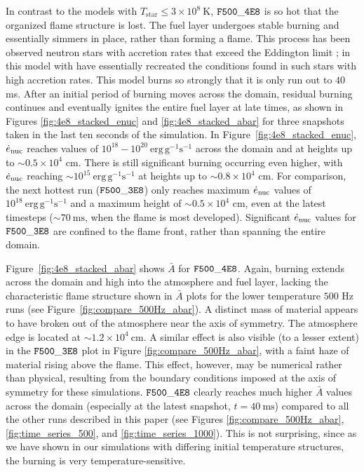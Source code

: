 \documentclass[preprint,times,tighten]{aastex63}
\newcommand{\enucdot}{\dot{e}_{\rm nuc}}
\newcommand{\MarginPar}[1]{
    \marginpar{\vskip-\baselineskip%
               \raggedright%
               \tiny\sffamily%
               {\color{red}\hrule%
               \smallskip%
               #1\par%
               \smallskip%
               \hrule}}%
}
\begin{document}
In contrast to the models with $T_{\mathrm{star}} \leq 3 \times 10^8~\mathrm{K}$, $\tt{F500\_4E8}$ is so hot that the organized flame structure is lost. The fuel layer undergoes stable burning and essentially simmers in place, rather than forming a flame. This process has been observed neutron stars with accretion rates that exceed the Eddington limit \citep{fujimoto1981,bildsten1998thermonuclear,keek2009effect}; in this model with have essentially recreated the conditions found in such stars with high accretion rates. This model burns so strongly that it is only run out to $40$ ms. After an initial period of burning moves across the domain, residual burning continues and eventually ignites the entire fuel layer at late times, as shown in Figures \ref{fig:4e8_stacked_enuc} and \ref{fig:4e8_stacked_abar} for three snapshots taken in the last ten seconds of the simulation. In Figure~\ref{fig:4e8_stacked_enuc}, $\enucdot$ reaches values of $10^{18} - 10^{20}~\mathrm{erg}\,\mathrm{g}^{-1} \mathrm{s}^{-1}$ across the domain and at heights up to $\sim 0.5\times 10^4$ cm. There is still significant burning occurring even higher, with $\enucdot$ reaching $\sim 10^{15}~\mathrm{erg}\,\mathrm{g}^{-1} \mathrm{s}^{-1}$ at heights up to $\sim 0.8\times 10^4$ cm. For comparison, the next hottest run ($\tt{F500\_3E8}$) only reaches maximum $\enucdot$ values of $10^{18}~\mathrm{erg}\,\mathrm{g}^{-1} \mathrm{s}^{-1}$ and a maximum height of $\sim 0.5\times 10^4$ cm, even at the latest timesteps ($\sim 70~\mathrm{ms}$, when the flame is most developed). Significant $\enucdot$ values for $\tt{F500\_3E8}$ are confined to the flame front, rather than spanning the entire domain.

\MarginPar{NF: should I include a plot for this or is it ok to just say it?}
Figure~\ref{fig:4e8_stacked_abar} shows $\bar{A}$ for $\tt{F500\_4E8}$. Again, burning extends across the domain and high into the atmosphere and fuel layer, lacking the characteristic flame structure shown in $\bar{A}$ plots for the lower temperature $500$ Hz runs (see Figure~\ref{fig:compare_500Hz_abar}). A distinct mass of material appears to have broken out of the atmosphere near the axis of symmetry. The atmosphere edge is located at $\sim 1.2\times 10^4~\mathrm{cm}$. {\color{blue}A similar effect is also visible (to a lesser extent) in the $\tt{F500\_3E8}$ plot in Figure \ref{fig:compare_500Hz_abar}, with a faint haze of material rising above the flame. This effect, however, may be numerical rather than physical, resulting from the boundary conditions imposed at the axis of symmetry for these simulations.} $\tt{F500\_4E8}$ clearly reaches much higher $\bar{A}$ values across the domain (especially at the latest snapshot, $t = 40~\mathrm{ms}$) compared to all the other runs described in this paper (see Figures \ref{fig:compare_500Hz_abar}, \ref{fig:time_series_500}, and \ref{fig:time_series_1000}). This is not surprising, since as we have shown in our simulations with differing initial temperature structures, the burning is very temperature-sensitive. 
\end{document}
